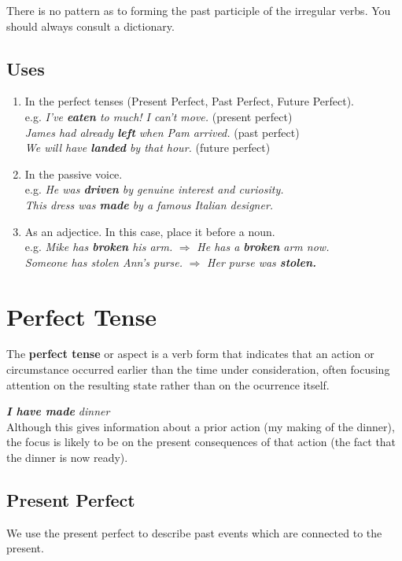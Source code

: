 \documentclass[hidelinks,10pt,a4paper]{article}
\begin{document}
There is no pattern as to forming the past participle of the irregular verbs. You should always consult a dictionary.

\subsection{Uses}
\begin{enumerate}[label=(\alph*)]
	\item In the perfect tenses (Present Perfect, Past Perfect, Future Perfect). \\
		e.g. \textit{I've \textbf{eaten} to much! I can't move.} (present perfect) \\
			\textit{James had already \textbf{left} when Pam arrived.} (past perfect) \\
			\textit{We will have \textbf{landed} by that hour.} (future perfect)
	\item In the passive voice. \\
		e.g. \textit{He was \textbf{driven} by genuine interest and curiosity.\\
		This dress was \textbf{made} by a famous Italian designer.}
	\item As an adjectice. In this case, place it before a noun. \\
		e.g. \textit{Mike has \textbf{broken} his arm.} $\Rightarrow$ \textit{He has a \textbf{broken} arm now.\\
		Someone has stolen Ann's purse.} $\Rightarrow$ \textit{Her purse was \textbf{stolen.} }
\end{enumerate}

\section{Perfect Tense}
The \textbf{perfect tense} or aspect is a verb form that indicates that an action or circumstance occurred earlier than the time under consideration, often focusing attention on the resulting state rather than on the ocurrence itself.

\begin{center}
	\textit{ \textbf{I have made} dinner}\\
	Although this gives information about a prior action (my making of the dinner), the focus is likely to be on the present consequences of that action (the fact that the dinner is now ready).
\end{center}

\subsection{Present Perfect}
We use the present perfect to describe past events which are connected to the present.
\end{document}
